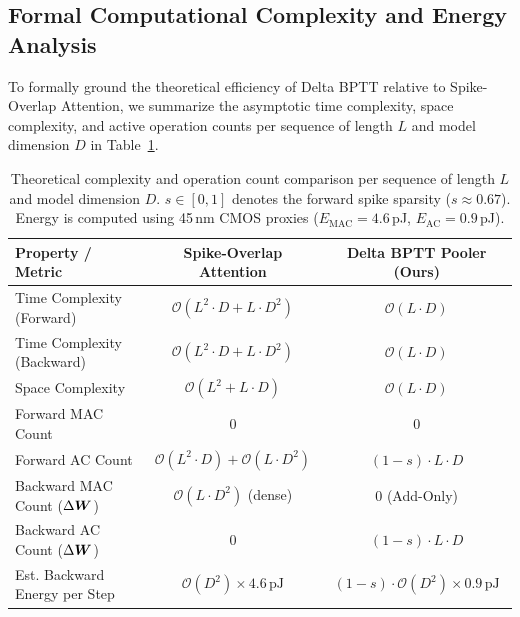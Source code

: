 \documentclass[10pt]{article} %
\begin{document}
\subsection{Formal Computational Complexity and Energy Analysis}
To formally ground the theoretical efficiency of Delta BPTT relative to Spike-Overlap Attention, we summarize the asymptotic time complexity, space complexity, and active operation counts per sequence of length $L$ and model dimension $D$ in Table~\ref{tab:complexity}.

\begin{table}[t!]
\caption{Theoretical complexity and operation count comparison per sequence of length $L$ and model dimension $D$. $s \in [0,1]$ denotes the forward spike sparsity ($s \approx 0.67$). Energy is computed using 45\,nm CMOS proxies ($E_{\text{MAC}} = 4.6$\,pJ, $E_{\text{AC}} = 0.9$\,pJ).}
\label{tab:complexity}
\begin{center}
\begin{tabular}{lcc}
\toprule
\textbf{Property / Metric} & \textbf{Spike-Overlap Attention} & \textbf{Delta BPTT Pooler (Ours)} \\
\midrule
Time Complexity (Forward) & $\mathcal{O}(L^2 \cdot D + L \cdot D^2)$ & $\mathcal{O}(L \cdot D)$ \\
Time Complexity (Backward) & $\mathcal{O}(L^2 \cdot D + L \cdot D^2)$ & $\mathcal{O}(L \cdot D)$ \\
Space Complexity & $\mathcal{O}(L^2 + L \cdot D)$ & $\mathcal{O}(L \cdot D)$ \\
Forward MAC Count & $0$ & $0$ \\
Forward AC Count & $\mathcal{O}(L^2 \cdot D) + \mathcal{O}(L \cdot D^2)$ & $(1-s) \cdot L \cdot D$ \\
Backward MAC Count ($\Delta \boldsymbol{W}$) & $\mathcal{O}(L \cdot D^2)$ (dense) & $0$ (Add-Only) \\
Backward AC Count ($\Delta \boldsymbol{W}$) & $0$ & $(1-s) \cdot L \cdot D$ \\
\midrule
Est. Backward Energy per Step & $\mathcal{O}(D^2) \times 4.6\,\text{pJ}$ & $(1-s) \cdot \mathcal{O}(D^2) \times 0.9\,\text{pJ}$ \\
\bottomrule
\end{tabular}
\end{center}
\end{table}
\end{document}
